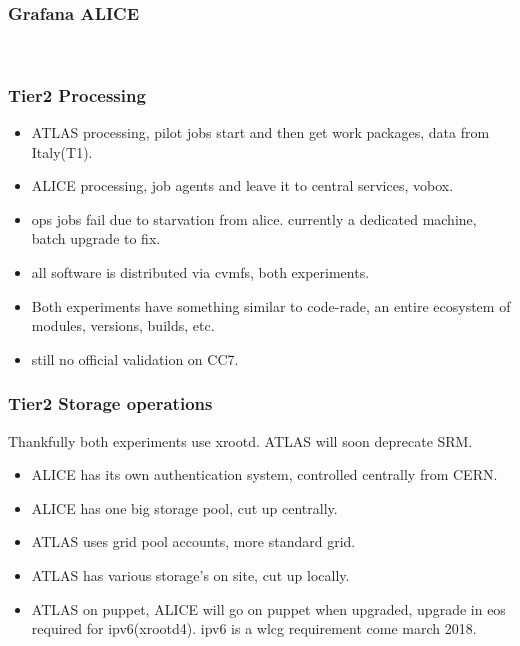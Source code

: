 \documentclass{beamer}
\begin{document}
\begin{frame}
  \frametitle{Grafana ALICE}
  \\
\end{frame}

\begin{frame}
  \frametitle{Tier2 Processing}
  \begin{itemize}
      \item ATLAS processing, pilot jobs start and then get work packages, data from Italy(T1).
    \item ALICE processing, job agents and leave it to central services, vobox.
    \item ops jobs fail due to starvation from alice. currently a dedicated machine, batch upgrade to fix.
    \item all software is distributed via cvmfs, both experiments.
    \item Both experiments have something similar to code-rade, an entire ecosystem of modules, versions, builds, etc.
    \item still no official validation on CC7.
  \end{itemize}
\end{frame}

\begin{frame}
  \frametitle{Tier2 Storage operations}
  Thankfully both experiments use xrootd. ATLAS will soon deprecate SRM.
  \begin{itemize}
    \item ALICE has its own authentication system, controlled centrally from CERN.
    \item ALICE has one big storage pool, cut up centrally.
    \item ATLAS uses grid pool accounts, more standard grid.
    \item ATLAS has various storage's on site, cut up locally.
    \item ATLAS on puppet, ALICE will go on puppet when upgraded, upgrade in eos required for ipv6(xrootd4). ipv6 is a wlcg requirement come march 2018.
  \end{itemize}
\end{frame}
\end{document}
